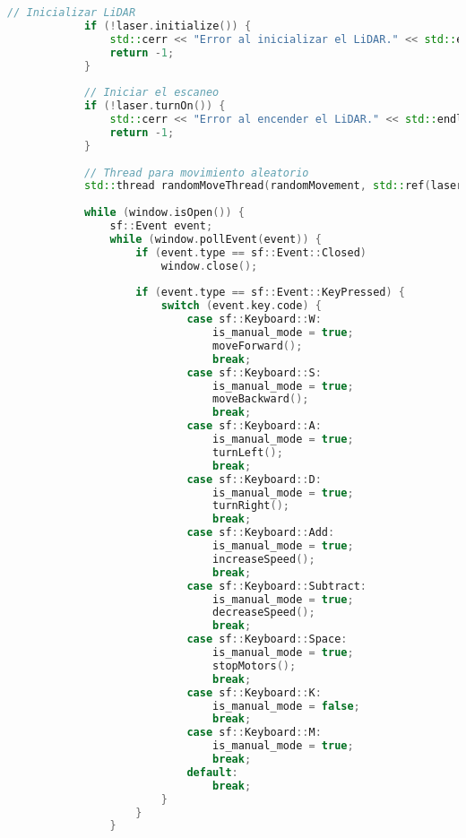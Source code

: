 \begin{lstlisting}[language={C++}, caption={Primera versi\'on del c\'odigo del sistema de control del robot}, label={PrimeraVersionCodigoRobot}]
            // Inicializar LiDAR
            if (!laser.initialize()) {
                std::cerr << "Error al inicializar el LiDAR." << std::endl;
                return -1;
            }
        
            // Iniciar el escaneo
            if (!laser.turnOn()) {
                std::cerr << "Error al encender el LiDAR." << std::endl;
                return -1;
            }
        
            // Thread para movimiento aleatorio
            std::thread randomMoveThread(randomMovement, std::ref(laser));
        
            while (window.isOpen()) {
                sf::Event event;
                while (window.pollEvent(event)) {
                    if (event.type == sf::Event::Closed)
                        window.close();
        
                    if (event.type == sf::Event::KeyPressed) {
                        switch (event.key.code) {
                            case sf::Keyboard::W:
                                is_manual_mode = true;
                                moveForward();
                                break;
                            case sf::Keyboard::S:
                                is_manual_mode = true;
                                moveBackward();
                                break;
                            case sf::Keyboard::A:
                                is_manual_mode = true;
                                turnLeft();
                                break;
                            case sf::Keyboard::D:
                                is_manual_mode = true;
                                turnRight();
                                break;
                            case sf::Keyboard::Add:
                                is_manual_mode = true;
                                increaseSpeed();
                                break;
                            case sf::Keyboard::Subtract:
                                is_manual_mode = true;
                                decreaseSpeed();
                                break;
                            case sf::Keyboard::Space:
                                is_manual_mode = true;
                                stopMotors();
                                break;
                            case sf::Keyboard::K:
                                is_manual_mode = false;
                                break;
                            case sf::Keyboard::M:
                                is_manual_mode = true;
                                break;
                            default:
                                break;
                        }
                    }
                }
        

\end{lstlisting}

